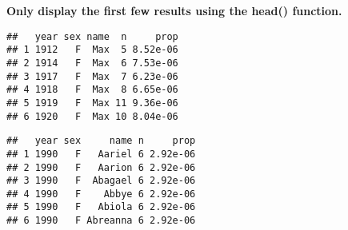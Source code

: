 \documentclass[
]{article}
\newenvironment{Shaded}{\begin{snugshade}}{\end{snugshade}}
\newcommand{\DecValTok}[1]{\textcolor[rgb]{0.00,0.00,0.81}{#1}}
\newcommand{\KeywordTok}[1]{\textcolor[rgb]{0.13,0.29,0.53}{\textbf{#1}}}
\newcommand{\NormalTok}[1]{#1}
\newcommand{\OperatorTok}[1]{\textcolor[rgb]{0.81,0.36,0.00}{\textbf{#1}}}
\newcommand{\StringTok}[1]{\textcolor[rgb]{0.31,0.60,0.02}{#1}}
\begin{document}
\textbf{Only display the first few results using the head() function.}

\begin{Shaded}
\end{Shaded}

\begin{verbatim}
##   year sex name  n     prop
## 1 1912   F  Max  5 8.52e-06
## 2 1914   F  Max  6 7.53e-06
## 3 1917   F  Max  7 6.23e-06
## 4 1918   F  Max  8 6.65e-06
## 5 1919   F  Max 11 9.36e-06
## 6 1920   F  Max 10 8.04e-06
\end{verbatim}

\begin{Shaded}
\end{Shaded}

\begin{verbatim}
##   year sex     name n     prop
## 1 1990   F   Aariel 6 2.92e-06
## 2 1990   F   Aarion 6 2.92e-06
## 3 1990   F  Abagael 6 2.92e-06
## 4 1990   F    Abbye 6 2.92e-06
## 5 1990   F   Abiola 6 2.92e-06
## 6 1990   F Abreanna 6 2.92e-06
\end{verbatim}

\begin{Shaded}
\end{Shaded}
\end{document}
